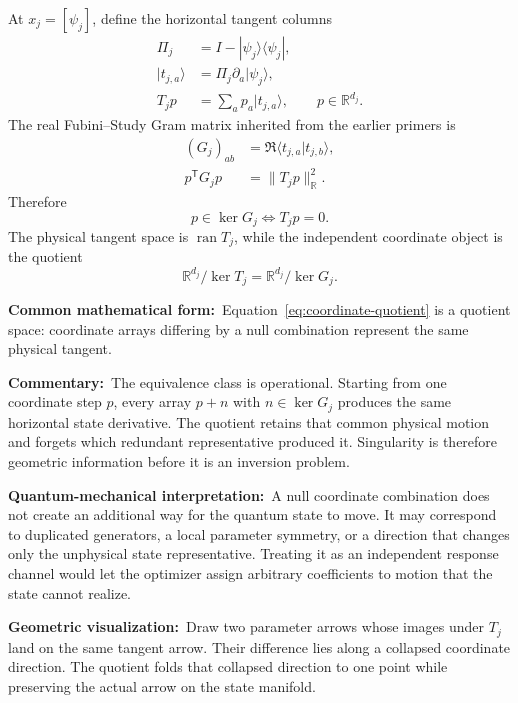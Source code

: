 \documentclass[10pt,twocolumn]{article}
\newcommand{\ket}[1]{|#1\rangle}
\newcommand{\bra}[1]{\langle #1|}
\newcommand{\form}[1]{\par\noindent\textbf{Common mathematical form:}\ #1\par}
\newcommand{\commentary}[1]{\par\noindent\textbf{Commentary:}\ #1\par}
\newcommand{\phys}[1]{\par\noindent\textbf{Quantum-mechanical interpretation:}\ #1\par}
\newcommand{\geom}[1]{\par\noindent\textbf{Geometric visualization:}\ \textcolor{teal!70!black}{#1}\par}
\begin{document}
At \(x_j=[\psi_j]\), define the horizontal tangent columns
\begin{align}
\Pi_j&=I-\ket{\psi_j}\bra{\psi_j},
\label{eq:horizontal-projector}\\
\ket{t_{j,a}}&=\Pi_j\partial_a\ket{\psi_j},
\label{eq:horizontal-tangent}\\
T_jp&=\sum_a p_a\ket{t_{j,a}},
\qquad p\in\mathbb R^{d_j}.
\label{eq:tangent-map}
\end{align}
The real Fubini--Study Gram matrix inherited from the earlier primers is
\begin{align}
(G_j)_{ab}
&=\Re\langle t_{j,a}|t_{j,b}\rangle,
\label{eq:fs-gram}\\
p^{\mathsf T}G_jp
&=\|T_jp\|_{\mathbb R}^2.
\label{eq:gram-pullback}
\end{align}
Therefore
\begin{equation}
p\in\ker G_j
\Longleftrightarrow
T_jp=0.
\label{eq:null-equivalence}
\end{equation}
The physical tangent space is \(\operatorname{ran}T_j\), while the independent
coordinate object is the quotient
\begin{equation}
\mathbb R^{d_j}/\ker T_j
=\mathbb R^{d_j}/\ker G_j.
\label{eq:coordinate-quotient}
\end{equation}

\form{Equation~\eqref{eq:coordinate-quotient} is a quotient space: coordinate
arrays differing by a null combination represent the same physical tangent.}

\commentary{The equivalence class is operational. Starting from one coordinate
step \(p\), every array \(p+n\) with \(n\in\ker G_j\) produces the same
horizontal state derivative. The quotient retains that common physical motion
and forgets which redundant representative produced it. Singularity is therefore
geometric information before it is an inversion problem.}

\phys{A null coordinate combination does not create an additional way for the
quantum state to move. It may correspond to duplicated generators, a local
parameter symmetry, or a direction that changes only the unphysical state
representative. Treating it as an independent response channel would let the
optimizer assign arbitrary coefficients to motion that the state cannot
realize.}

\geom{Draw two parameter arrows whose images under \(T_j\) land on the same
tangent arrow. Their difference lies along a collapsed coordinate direction.
The quotient folds that collapsed direction to one point while preserving the
actual arrow on the state manifold.}
\end{document}
